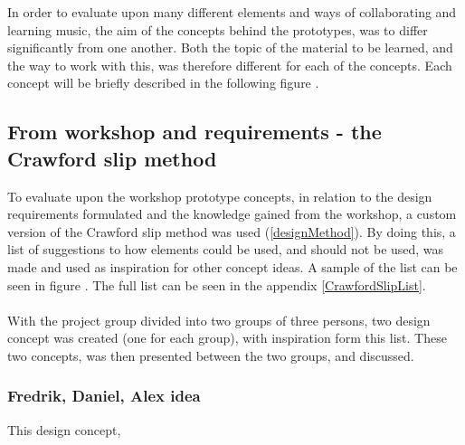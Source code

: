 In order to evaluate upon many different elements and ways of collaborating and learning music, the aim of the concepts behind the prototypes, was to differ significantly from one another. Both the topic of the material to be learned, and the way to work with this, was therefore different for each of the concepts. Each concept will be briefly described in the following figure .


\subsection{From workshop and requirements - the Crawford slip method}
To evaluate upon the workshop prototype concepts, in relation to the design requirements formulated and the knowledge gained from the workshop, a custom version of the Crawford slip method was used (\autoref{designMethod}). By doing this, a list of suggestions to how elements could be used, and should not be used, was made and used as inspiration for other concept ideas. A sample of the list can be seen in figure . The full list can be seen in the appendix \autoref{CrawfordSlipList}.  
\\\\


With the project group divided into two groups of three persons, two design concept was created (one for each group), with inspiration form this list. These two concepts, was then presented between the two groups, and discussed.  

\subsubsection{Fredrik, Daniel, Alex idea}
This design concept, 

